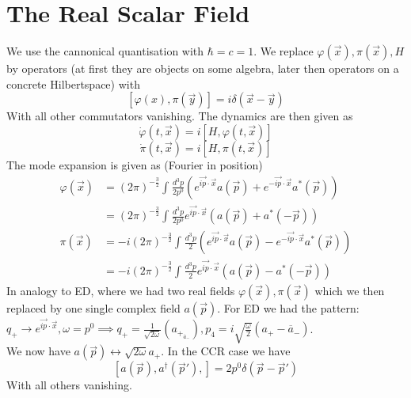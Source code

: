 \documentclass{report}
\begin{document}
\section{The Real Scalar Field}
We use the cannonical quantisation with $\hbar = c = 1$. We replace $\varphi\left( \vec{x} \right) , \pi\left( \vec{x} \right) ,H$ by operators (at first they are objects on some algebra, later then operators on a concrete Hilbertspace) with \[
\left[ \varphi\left( x \right) , \pi\left( \vec{y} \right)  \right] = i \delta\left( \vec{x} - \vec{y} \right) 
\] With all other commutators vanishing. The dynamics are then given as \[
\dot{\varphi}\left( t, \vec{x} \right) = i \left[ H, \varphi\left( t, \vec{x} \right)  \right] 
\] \[
\dot{\pi}\left( t, \vec{x} \right) = i \left[ H, \pi\left( t, \vec{x} \right)  \right] 
\] The mode expansion is given as (Fourier in position)
\begin{align*}
  \varphi\left( \vec{x} \right) &= \left( 2\pi \right) ^{-\frac{3}{2} } \int_{}^{} \frac{d^3p}{2p^{0} } \left( e^{\vec{ip}\cdot \vec{x}} a\left( \vec{p} \right) + e^{-\vec{ip}\cdot \vec{x}} a^{*} \left( \vec{p} \right)  \right)  \\
  &= \left( 2\pi \right) ^{-\frac{3}{2} } \int_{}^{} \frac{d^3p}{2p^{0} } e^{\vec{ip}\cdot \vec{x}} \left( a\left( \vec{p} \right) + a^{*} \left( -\vec{p} \right)  \right)   \\
  \pi\left( \vec{x} \right) &= -i\left( 2\pi \right) ^{-\frac{3}{2} } \int_{}^{} \frac{d^3p}{2} \left( e^{\vec{ip}\cdot \vec{x}} a\left( \vec{p} \right) - e^{-\vec{ip}\cdot \vec{x}} a^{*} \left( \vec{p} \right)  \right)   \\
  &= -i\left( 2\pi \right) ^{-\frac{3}{2} } \int_{}^{} \frac{d^3p}{2} e^{\vec{ip}\cdot \vec{x}} \left( a\left( \vec{p} \right) - a^{*} \left( -\vec{p} \right)  \right) 
\end{align*}
In analogy to ED, where we had two real fields $\varphi\left( \vec{x} \right) ,\pi\left( \vec{x} \right) $ which we then replaced by one single complex field $a\left( \vec{p} \right) $. For ED we had the pattern: $q_+ \to e^{\vec{ip}\cdot \vec{x}} , \omega = p^{0} \implies q_+ = \frac{1}{\sqrt{2\omega} } \left( a_{+} _ \overline{a}_- \right) , p_4 = i \sqrt{\frac{\omega}{2} } \left( a_+-\overline{a}_- \right) $.\\
We now have $a\left( \vec{p} \right) \leftrightarrow \sqrt{2 \omega} a_+$. In the CCR case we have \[
  \left[ a\left( \vec{p} \right) , a^\dagger\left( \vec{p}' \right) ,  \right] = 2p^{0} \delta\left( \vec{p}-\vec{p}' \right) 
\] With all others vanishing.
\end{document}
